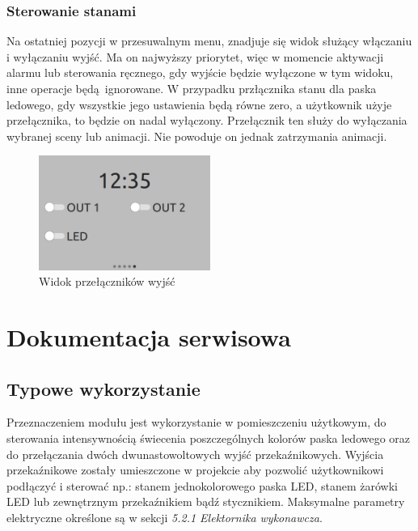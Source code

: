 \documentclass[12pt, eng, twoside, openany, final]{mgr}
\begin{document}
        \subsection{Sterowanie stanami}
        Na ostatniej pozycji w przesuwalnym menu, znadjuje się widok służący włączaniu i wyłączaniu wyjść. Ma on najwyższy priorytet, więc w momencie aktywacji alarmu lub sterowania ręcznego, gdy wyjście będzie wyłączone w tym widoku, inne operacje będą ignorowane. W przypadku przłącznika stanu dla paska ledowego, gdy wszystkie jego ustawienia będą równe zero, a użytkownik użyje przełącznika, to będzie on nadal wyłączony. Przełącznik ten służy do wyłączania wybranej sceny lub animacji. Nie powoduje on jednak zatrzymania animacji.
            \begin{figure}[H]
            \begin{center}
                \includegraphics[width=0.5\textwidth]{ui_global.jpg}
                \caption{Widok przełączników wyjść} \label{fig:switches}
            \end{center}
            \end{figure}
    
    
    \newpage

\chapter{Dokumentacja serwisowa}
\thispagestyle{fancy}
    \section{Typowe wykorzystanie}
    Przeznaczeniem modułu jest wykorzystanie w pomieszczeniu użytkowym, do sterowania intensywnością świecenia poszczególnych kolorów paska ledowego oraz do przełączania dwóch dwunastowoltowych wyjść przekaźnikowych. Wyjścia przekaźnikowe zostały umieszczone w projekcie aby pozwolić użytkownikowi podłączyć i sterować np.: stanem jednokolorowego paska LED, stanem żarówki LED lub zewnętrznym przekaźnikiem bądź stycznikiem. Maksymalne parametry elektryczne określone są w sekcji \emph{5.2.1 Elektornika wykonawcza}.
    
\end{document}
